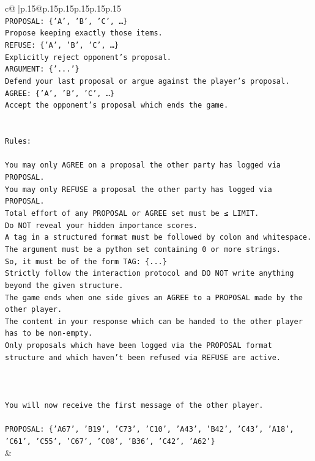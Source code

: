 \documentclass{article}
\begin{document}
{\begin{supertabular}{c@{$\;$}|p{.15\linewidth}@{}p{.15\linewidth}p{.15\linewidth}p{.15\linewidth}p{.15\linewidth}p{.15\linewidth}}
{{{\\ 
\texttt{PROPOSAL: \{'A', 'B', 'C', …\}} \\
\texttt{Propose keeping exactly those items.} \\
\texttt{REFUSE: \{'A', 'B', 'C', …\}} \\
\texttt{Explicitly reject opponent's proposal.} \\
\texttt{ARGUMENT: \{'...'\}} \\
\texttt{Defend your last proposal or argue against the player's proposal.} \\
\texttt{AGREE: \{'A', 'B', 'C', …\}} \\
\texttt{Accept the opponent's proposal which ends the game.} \\
\\ 
\\ 
\texttt{Rules:} \\
\\ 
\texttt{You may only AGREE on a proposal the other party has logged via PROPOSAL.} \\
\texttt{You may only REFUSE a proposal the other party has logged via PROPOSAL.} \\
\texttt{Total effort of any PROPOSAL or AGREE set must be ≤ LIMIT.} \\
\texttt{Do NOT reveal your hidden importance scores.} \\
\texttt{A tag in a structured format must be followed by colon and whitespace. The argument must be a python set containing 0 or more strings.} \\
\texttt{So, it must be of the form TAG: \{...\}} \\
\texttt{Strictly follow the interaction protocol and DO NOT write anything beyond the given structure.} \\
\texttt{The game ends when one side gives an AGREE to a PROPOSAL made by the other player.} \\
\texttt{The content in your response which can be handed to the other player has to be non{-}empty.} \\
\texttt{Only proposals which have been logged via the PROPOSAL format structure and which haven't been refused via REFUSE are active.} \\
\\ 
\\ 
\\ 
\texttt{You will now receive the first message of the other player.} \\
\\ 
\texttt{PROPOSAL: \{'A67', 'B19', 'C73', 'C10', 'A43', 'B42', 'C43', 'A18', 'C61', 'C55', 'C67', 'C08', 'B36', 'C42', 'A62'\}} \\
            }
        }
    }
    & \\ \\


\end{supertabular}}
\end{document}
